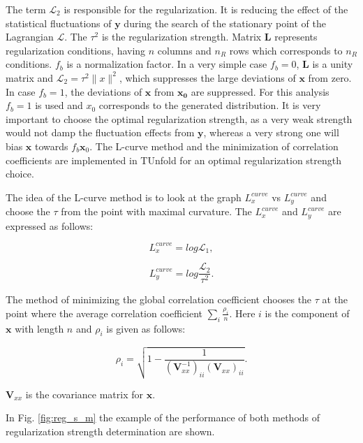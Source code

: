 The term $\mathcal{L}_{2}$ is responsible for the regularization. It is reducing the effect of the statistical fluctuations of $\mathbf{y}$
during the search of the stationary point of the Lagrangian $\mathcal{L}$. The $\tau^{2}$ is the regularization strength. Matrix $\mathbf{L}$
represents regularization conditions, having $n$ columns and $n_{R}$ rows which corresponds to $n_{R}$ conditions. $f_{b}$ is a normalization 
factor. In a very simple case $f_{b} = 0$, $\mathbf{L}$ is a unity matrix and $\mathcal{L}_{2} = \tau^{2} \parallel x \parallel^{2}$, which
suppresses the large deviations of $\mathbf{x}$ from zero. In case $f_{b} = 1$, the deviations of $\mathbf{x}$ from $\mathbf{x_{0}}$ are
suppressed. For this analysis $f_{b} = 1$ is used and $x_{0}$ corresponds to the generated distribution. It is very important to choose 
the optimal regularization strength, as a very weak strength would not damp the fluctuation effects from $\mathbf{y}$, whereas a very strong 
one will bias $\mathbf{x}$ towards $f_{b}\mathbf{x}_{0}$. The L-curve method \cite{Hansen00thel-curve} and the minimization
of correlation coefficients \cite{VBlobelT} are implemented in TUnfold for an optimal regularization strength choice. 

The idea of the L-curve method is to look at the graph $L_{x}^{curve}$ vs $L_{y}^{curve}$ and choose the $\tau$ from the point with
maximal curvature. The $L_{x}^{curve}$ and $L_{y}^{curve}$ are expressed as follows:

\begin{equation}
 L_{x}^{curve} = log \mathcal{L}_{1},
\end{equation}

\begin{equation}
 L_{y}^{curve} = log \frac{\mathcal{L}_{2}}{\tau^{2}}.
\end{equation}

The method of minimizing the global correlation coefficient chooses the $\tau$ at the point where the average correlation coefficient 
$\sum_{i} \frac{\rho_{i}}{n}$. Here $i$ is the component of $\mathbf{x}$ with length $n$ and $\rho_{i}$ is given as follows:\

\begin{equation}
 \rho_{i} = \sqrt{1 - \frac{1}{(\mathbf{V}_{xx}^{-1})_{ii} (\mathbf{V}_{xx})_{ii}}}.
\end{equation}

$\mathbf{V}_{xx}$ is the covariance matrix for $\mathbf{x}$.

In Fig. \ref{fig:reg_s_m} the example of the performance of both methods of regularization strength determination are shown.


